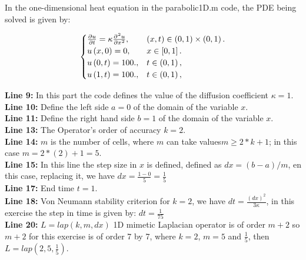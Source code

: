 In the one-dimensional heat equation in the parabolic1D.m code, the PDE being solved is given by:


\begin{equation}\label{eq:IBVPheat1d}
	\begin{cases}
		\diffp{u}{t}=
		\kappa\diffp[2]{u}{x},
		                         & \left(x,t\right)\in
		\left(0,1 \right)\times\left(0, 1 \right).     \\
		u\left(x,0\right)= 0,
		                         & x\in
		\left[0,1\right].                              \\
		u\left(0,t\right)= 100., & t\in
		\left(0,1 \right),                             \\
		u\left(1,t\right)= 100.,
		                         & t\in
		\left(0, 1\right),
	\end{cases}
\end{equation}


\textbf{Line 9:} In this part the code defines the value of the diffusion coefficient $\kappa =1$.\\

\textbf{Line 10:} Define the left side $a= 0$ of the domain of the variable $x$.\\

\textbf{Line 11:} Define the right hand side $b= 1$ of the domain of the variable $x$.\\

\textbf{Line 13:} The Operator's order of accuracy $k = 2$.\\

\textbf{Line 14:} $m$ is the number of cells, where $m$ can take values ​​$m \geq 2*k+1$; in this case $m=2*(2)+1=5$.\\

\textbf{Line 15:} In this line the step size in $x$ is defined, defined as $dx=(b-a)/m$, en this case, replacing it, we have $dx =\frac{1-0}{5} =\frac{1}{5}$ \\

\textbf{Line 17:} End time $t=1$.\\

\textbf{Line 18:} Von Neumann stability criterion for $k=2$, we have $ dt = \frac{(dx)^{2}}{3 \kappa}$, in this exercise the step in time is given by: $dt =\frac{1}{75}$\\

\textbf{Line 20:} $L = lap(k,m,dx)$ 1D mimetic Laplacian operator is of order $m+2$ so $m+2$ for this exercise is of order 7 by 7, where $k=2$, $m = 5$ and $\frac{1}{5}$, then $L = lap(2,5,\frac{1}{5})$.\\


